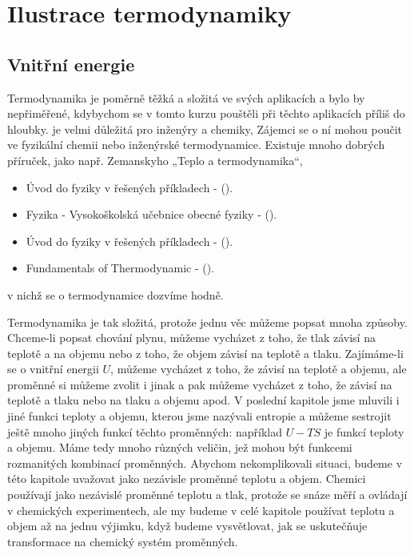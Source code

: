 \setchaptertoc
\chapter{Ilustrace termodynamiky}\label{fyz:IchapXLV}
  \section{Vnitřní energie}\label{fyz:IchapXLVsecI}
    Termodynamika je poměrně těžká a složitá ve svých aplikacích a bylo by nepřiměřené, kdybychom se
    v tomto kurzu pouštěli při těchto aplikacích příliš do hloubky. je velmi důležitá pro inženýry a
    chemiky, Zájemci se o ní mohou poučit ve fyzikální chemii nebo inženýrské termodynamice.
    Existuje mnoho dobrých příruček, jako např. Zemanskyho „Teplo a termodynamika“, 
    \begin{itemize}[noitemsep]
      \item Úvod do fyziky v řešených příkladech - (\cite{Havrankova1995}).
      \item Fyzika - Vysokoškolská učebnice obecné fyziky - (\cite{Halliday2001}).
      \item Úvod do fyziky v řešených příkladech - (\cite{Havrankova1995}).
      \item Fundamentals of Thermodynamic - (\cite{Borgnakke2012}).
    \end{itemize}
    v nichž se o termodynamice dozvíme hodně. 

    Termodynamika je tak složitá, protože jednu věc můžeme popsat mnoha způsoby. Chceme-li popsat
    chování plynu, můžeme vycházet z toho, že tlak závisí na teplotě a na objemu nebo z toho, že
    objem závisí na teplotě a tlaku. Zajímáme-li se o vnitřní energii \(U\), můžeme vycházet z toho,
    že závisí na teplotě a objemu, ale proměnné si můžeme zvolit i jinak a pak můžeme vycházet z
    toho, že závisí na teplotě a tlaku nebo na tlaku a objemu apod. V poslední kapitole jsme mluvili
    i jiné funkci teploty a objemu, kterou jsme nazývali entropie a můžeme sestrojit ještě mnoho
    jiných funkcí těchto proměnných: například \(U - TS\) je funkcí teploty a objemu. Máme tedy
    mnoho různých veličin, jež mohou být funkcemi rozmanitých kombinací proměnných. Abychom
    nekomplikovali situaci, budeme v této kapitole uvažovat jako nezávisle proměnné teplotu a objem.
    Chemici používají jako nezávislé proměnné teplotu a tlak, protože se snáze měří a ovládají v
    chemických experimentech, ale my budeme v celé kapitole používat teplotu a objem až na jednu
    výjimku, když budeme vysvětlovat, jak se uskutečňuje transformace na chemický systém proměnných.
    

